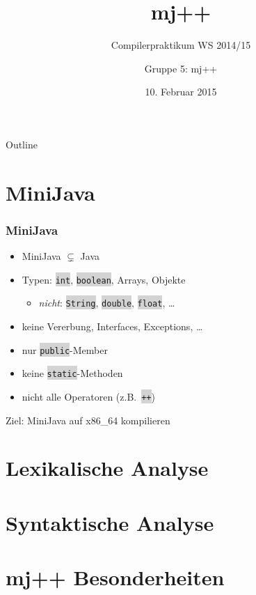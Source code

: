 \documentclass[18pt]{beamer}
\title[]{mj++}
\subtitle{Compilerpraktikum WS 2014/15}
\author{Gruppe 5: mj++}
\date{10. Februar 2015}
\institute{Institut für Programmstrukturen und Datenorganistation}
\newcommand{\code}[1]{\colorbox{lightgray}{\texttt{\upshape #1}}}
\begin{document}

\begin{frame}
\titlepage
\end{frame}

\begin{frame}{Outline}
\tableofcontents
\end{frame}

\section{MiniJava}

\begin{frame}
    \frametitle{MiniJava}
    \begin{itemize}
        \item MiniJava $\subsetneq$ Java
        \item Typen: \code{int}, \code{boolean}, Arrays, Objekte
            \begin{itemize}
                \item \emph{nicht}: \code{String}, \code{double}, \code{float}, \ldots
            \end{itemize}
        \item keine Vererbung, Interfaces, Exceptions, \ldots
        \item nur \code{public}-Member
        \item keine \code{static}-Methoden
        \item nicht alle Operatoren (z.B.\ \code{++})
    \end{itemize}
    \vskip 1cm
    \begin{center}
        Ziel: MiniJava auf x86\_64 kompilieren
    \end{center}
\end{frame}

\section{Lexikalische Analyse}


\section{Syntaktische Analyse}


\section{mj++ Besonderheiten}

\end{document}
